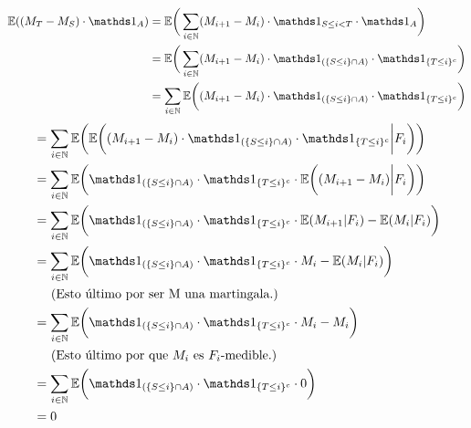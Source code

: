 	 \begin{align}
	 	\E((M_T - M_S) \cdot \indic_A)	
	 									&=		
	 	\E\bigg( \sum_{ i \in \N} ( M_{i+1} - M_i) \cdot \indic_{S \leq i < T } \cdot \indic_A \bigg)									\\
	 									&=		
	 	\E	\bigg( 
	 			\sum_{ i \in \N} 
	 				( M_{i+1} - M_i) \cdot \indic_{(\{S \leq i \} \cap A)} \cdot \indic_{\{ T \leq i \}^c} 
	 		\bigg)																														\\
	 									&=		
	 	\sum_{ i \in \N} 
	 		\E	\bigg(
	 				( M_{i+1} - M_i) \cdot \indic_{(\{S \leq i \} \cap A)} \cdot \indic_{\{ T \leq i \}^c} 
	 			\bigg)																													
	\end{align}
	\begin{align}
	 									&=		
	 	\sum_{ i \in \N} 
	 		\E	\bigg(
		 			\E	\bigg(
		 					( M_{i+1} - M_i) \cdot \indic_{(\{S \leq i \} \cap A)} \cdot \indic_{\{ T \leq i \}^c}  \bigg| F_i	
						\bigg)
	 			\bigg)																													\\
										&=
	 	\sum_{ i \in \N} 
	 		\E	\bigg(
					\indic_{(\{S \leq i \} \cap A)} \cdot \indic_{\{ T \leq i \}^c} \cdot
		 			\E	\bigg(
		 					 ( M_{i+1} - M_i)  \bigg| F_i	 												
						\bigg)
	 			\bigg)																													\\
										&=
	 	\sum_{ i \in \N} 
	 		\E	\bigg(
					\indic_{(\{S \leq i \} \cap A)} \cdot \indic_{\{ T \leq i \}^c} \cdot
		 			\E	(
		 					 M_{i+1} | F_i	 												
						)
					-
					\E	(
		 					 M_i  | F_i	 												
						)
	 			\bigg)																													\\
										&=
	 	\sum_{ i \in \N} 
	 		\E	\bigg(
					\indic_{(\{S \leq i \} \cap A)} \cdot \indic_{\{ T \leq i \}^c} \cdot
		 					 M_i
					-
					\E	(
		 					 M_i  | F_i	 												
						)
	 			\bigg)\label{problema1_4:aplicacion_de_que_M_es_martingala}																\\
										&\;\;\;\;\;\mbox{(Esto último por ser M una martingala.)}									    \\
										&=
	 	\sum_{ i \in \N} 
	 		\E	\bigg(
					\indic_{(\{S \leq i \} \cap A)} \cdot \indic_{\{ T \leq i \}^c} \cdot
		 			 M_i
						-
					 M_i
	 			\bigg)																													\\
										&\;\;\;\;\;\mbox{(Esto último por que $M_i$ es $F_i$-medible.)}								\\
										&=
		\sum_{ i \in \N} 
	 		\E	\bigg(
					\indic_{(\{S \leq i \} \cap A)} \cdot \indic_{\{ T \leq i \}^c} \cdot
		 			 0
	 			\bigg)																													\\
										&=
		0
	 \end{align}\par\null
	
